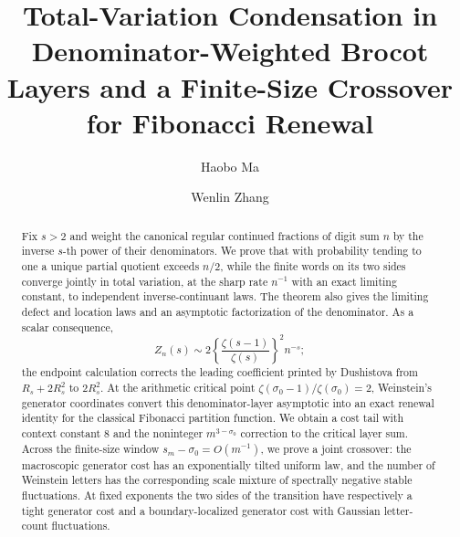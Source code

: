 \documentclass[12pt,reqno]{amsart}
\title[Condensation and a Fibonacci crossover]{Total-Variation Condensation
in Denominator-Weighted Brocot Layers and a Finite-Size Crossover for
Fibonacci Renewal}
\author{Haobo Ma}
\author{Wenlin Zhang}
\date{}
\theoremstyle{plain}
\theoremstyle{remark}
\theoremstyle{definition}
\numberwithin{equation}{section}
\begin{document}
\begin{abstract}
Fix \(s>2\) and weight the canonical regular continued fractions of digit
sum \(n\) by the inverse \(s\)-th power of their denominators.  We prove that
with probability tending to one a unique partial quotient exceeds \(n/2\),
while the finite words on its two sides converge jointly in total variation,
at the sharp rate \(n^{-1}\) with an exact limiting constant, to independent
inverse-continuant laws.  The theorem also gives the limiting
defect and location laws and an asymptotic factorization of the denominator.
As a scalar consequence,
\[
 Z_n(s)\sim
 2\left\{\frac{\zeta(s-1)}{\zeta(s)}\right\}^{\!2}n^{-s};
\]
the endpoint calculation corrects the leading coefficient printed by
Dushistova from \(R_s+2R_s^2\) to \(2R_s^2\).  At the arithmetic critical
point \(\zeta(\sigma_0-1)/\zeta(\sigma_0)=2\), Weinstein's generator
coordinates convert this denominator-layer asymptotic into an exact renewal
identity for the classical Fibonacci partition function.  We obtain a cost
tail with context constant \(8\) and the noninteger
\(m^{3-\sigma_0}\) correction to the critical layer sum.  Across the
finite-size window \(s_m-\sigma_0=O(m^{-1})\), we prove a joint crossover:
the macroscopic generator cost has an exponentially tilted uniform law, and
the number of Weinstein letters has the corresponding scale mixture of
spectrally negative stable fluctuations.  At fixed exponents the two sides
of the transition have respectively a tight generator cost and a
boundary-localized generator cost with Gaussian letter-count fluctuations.
\end{abstract}

\maketitle








\end{document}
